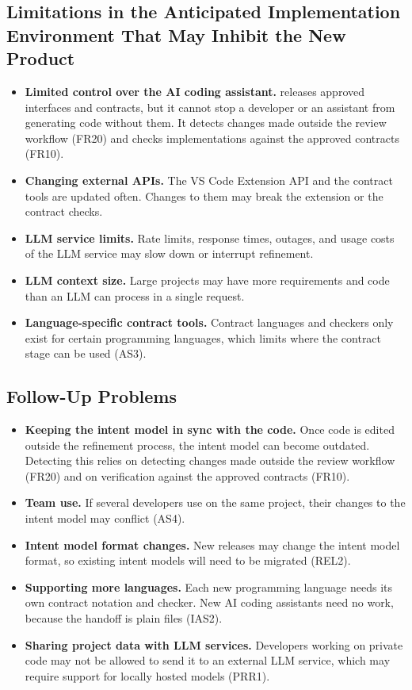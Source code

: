 \documentclass[12pt]{article}
\begin{document}
\subsection{Limitations in the Anticipated Implementation Environment That May
Inhibit the New Product}

\begin{itemize}
  \item \textbf{Limited control over the AI coding assistant.} \progname{}
  releases approved interfaces and contracts, but it cannot stop a developer or
  an assistant from generating code without them. It detects changes made
  outside the review workflow (FR20) and checks implementations against the
  approved contracts (FR10).
  \item \textbf{Changing external APIs.} The VS Code Extension API and the
  contract tools are updated often. Changes to them may break the extension or
  the contract checks.
  \item \textbf{LLM service limits.} Rate limits, response times, outages, and
  usage costs of the LLM service may slow down or interrupt refinement.
  \item \textbf{LLM context size.} Large projects may have more requirements and
  code than an LLM can process in a single request.
  \item \textbf{Language-specific contract tools.} Contract languages and
  checkers only exist for certain programming languages, which limits where the
  contract stage can be used (AS3).
\end{itemize}

\subsection{Follow-Up Problems}

\begin{itemize}
  \item \textbf{Keeping the intent model in sync with the code.} Once code is
  edited outside the refinement process, the intent model can become outdated.
  Detecting this relies on detecting changes made outside the review workflow
  (FR20) and on
  verification against the approved contracts (FR10).
  \item \textbf{Team use.} If several developers use \progname{} on the same
  project, their changes to the intent model may conflict (AS4).
  \item \textbf{Intent model format changes.} New releases may change the intent
  model format, so existing intent models will need to be migrated (REL2).
  \item \textbf{Supporting more languages.} Each new programming language needs
  its own contract notation and checker. New AI coding assistants need no work,
  because the handoff is plain files (IAS2).
  \item \textbf{Sharing project data with LLM services.} Developers working on
  private code may not be allowed to send it to an external LLM service, which
  may require support for locally hosted models (PRR1).
\end{itemize}
\end{document}
